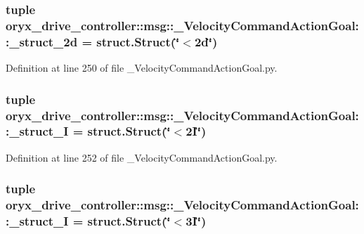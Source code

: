 \subsubsection[{\-\_\-struct\-\_\-2d}]{\setlength{\rightskip}{0pt plus 5cm}tuple {\bf oryx\-\_\-drive\-\_\-controller\-::msg\-::\-\_\-\-Velocity\-Command\-Action\-Goal\-::\-\_\-struct\-\_\-2d} = struct.\-Struct(\char`\"{}$<$2d\char`\"{})}\label{namespaceoryx__drive__controller_1_1msg_1_1__VelocityCommandActionGoal_ab7d0d894ba74b34d0ad60d9f8c3eaa40}


\-Definition at line 250 of file \-\_\-\-Velocity\-Command\-Action\-Goal.\-py.

\subsubsection[{\-\_\-struct\-\_\-2\-I}]{\setlength{\rightskip}{0pt plus 5cm}tuple {\bf oryx\-\_\-drive\-\_\-controller\-::msg\-::\-\_\-\-Velocity\-Command\-Action\-Goal\-::\-\_\-struct\-\_\-I} = struct.\-Struct(\char`\"{}$<$2\-I\char`\"{})}\label{namespaceoryx__drive__controller_1_1msg_1_1__VelocityCommandActionGoal_a503bc4a667f20ae10bc81253f2417ccc}


\-Definition at line 252 of file \-\_\-\-Velocity\-Command\-Action\-Goal.\-py.

\subsubsection[{\-\_\-struct\-\_\-3\-I}]{\setlength{\rightskip}{0pt plus 5cm}tuple {\bf oryx\-\_\-drive\-\_\-controller\-::msg\-::\-\_\-\-Velocity\-Command\-Action\-Goal\-::\-\_\-struct\-\_\-I} = struct.\-Struct(\char`\"{}$<$3\-I\char`\"{})}\label{namespaceoryx__drive__controller_1_1msg_1_1__VelocityCommandActionGoal_ab35ff03ea62be38779414e10d4ba0d50}


